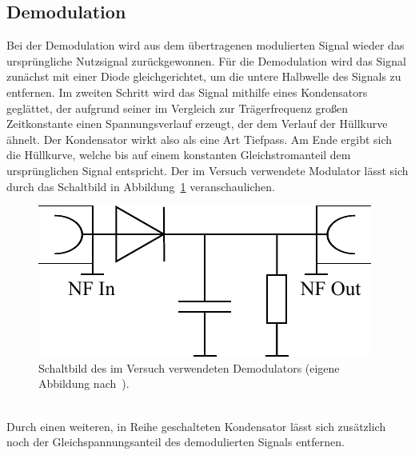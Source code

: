 \documentclass[a4paper,twoside,final]{article}
\begin{document}
\subsection{Demodulation}
Bei der Demodulation wird aus dem übertragenen modulierten Signal wieder das ursprüngliche Nutzsignal zurückgewonnen. Für die Demodulation wird das Signal zunächst mit einer Diode gleichgerichtet, um die untere Halbwelle des Signals zu entfernen. Im zweiten Schritt wird das Signal mithilfe eines Kondensators geglättet, der aufgrund seiner im Vergleich zur Trägerfrequenz großen Zeitkonstante einen Spannungsverlauf erzeugt, der dem Verlauf der Hüllkurve ähnelt. Der Kondensator wirkt also als eine Art Tiefpass. Am Ende ergibt sich die Hüllkurve, welche bis auf einem konstanten Gleichstromanteil dem ursprünglichen Signal entspricht. Der im Versuch verwendete Modulator lässt sich durch das Schaltbild in Abbildung~\ref{fig:Demodulator} veranschaulichen.
\begin{figure}[htp]
    \centering
    \includegraphics{Schaltungen/Demodulator.pdf}
    \caption{Schaltbild des im Versuch verwendeten Demodulators (eigene Abbildung nach~\cite{Perner}).}
    \label{fig:Demodulator}
\end{figure}\\
Durch einen weiteren, in Reihe geschalteten Kondensator lässt sich zusätzlich noch der Gleichspannungsanteil des demodulierten Signals entfernen.
\end{document}
